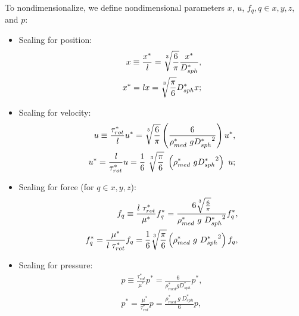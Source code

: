 \documentclass[10pt,a4paper]{article}
\def\l{\mathit{l}}
\def\Dss{D_{sph}^*}
\begin{document}
To nondimensionalize, we define nondimensional parameters $x$, $u$, $f_q, q \in x, y, z$,  and $p$:
\begin{itemize}
	\item Scaling for position:
	\begin{eqnarray*}
		x \equiv \frac{x^*}{\mathit{l}} = \sqrt[\uproot{5}3]{\frac{6}{\pi}}\frac{x^*}{ D_{sph}^*}, \\
	    x^* = \mathit{l} x = \sqrt[\uproot{5}3]{\frac{\pi}{6}} D_{sph}^* x;
    \end{eqnarray*} 
	\item Scaling for velocity:
		\begin{eqnarray*}
			u \equiv \frac{\tau^*_{rot}}{\mathit{l}} u^* = \sqrt[\uproot{5}3]{\frac{6}{\pi}} \left(\frac{6}{\rho_{med}^* ~ g {\Dss}^2} \right) u^*, \\
	      	u^* = \frac{\mathit{l}}{\tau^*_{rot}} u = \frac{1}{6} ~ \sqrt[\uproot{5}3]{\frac{\pi}{6}} ~ \left( \rho_{med}^* ~ g {\Dss}^2 \right) ~ u;
    \end{eqnarray*} 
	\item Scaling for force (for $q \in x, y, z$):
		\begin{eqnarray*}
			f_q \equiv \frac{\l ~ \tau^*_{rot}}{\mu^*} f_q^* = \frac{6 \sqrt[\uproot{5}3]{\frac{6}{\pi}}}{\rho_{med}^* ~ g ~ {\Dss}^2} f_q^*, \\
			f_q^* = \frac{\mu^*}{\l ~ \tau^*_{rot}} f_q = \frac{1}{6} \sqrt[\uproot{5}3]{\frac{\pi}{6}} \left( \rho_{med}^* ~ g ~ {\Dss}^2 \right) f_q, \\
    \end{eqnarray*} 
	\item Scaling for pressure:
		\begin{eqnarray*}
			p \equiv  \frac{\tau^*_{rot}}{\mu^*} p^* = \frac{6}{\rho_{med}^* g D_{sph}^*} p^*, \\
			p^* = \frac{\mu^*}{\tau^*_{rot}} p = \frac{\rho_{med}^* ~ g ~ D_{sph}^*}{6} p, 
    \end{eqnarray*} 
\end{itemize}
\end{document}
